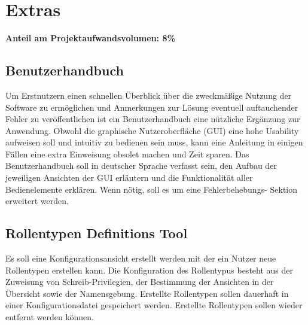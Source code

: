 \section{Extras}
    \textbf{Anteil am Projektaufwandsvolumen: 8\%}
    
    \subsection{Benutzerhandbuch}

    Um Erstnutzern einen schnellen Überblick über die zweckmäßige Nutzung der
    Software zu ermöglichen und Anmerkungen zur Lösung eventuell auftauchender
    Fehler zu veröffentlichen ist ein Benutzerhandbuch eine nützliche Ergänzung
    zur Anwendung. Obwohl die graphische Nutzeroberfläche (GUI) eine hohe
    Usability aufweisen soll und intuitiv zu bedienen sein muss, kann eine
    Anleitung in einigen Fällen eine extra Einweisung obsolet machen und Zeit
    sparen. Das Benutzerhandbuch soll in deutscher Sprache verfasst sein, den
    Aufbau der jeweiligen Ansichten der GUI erläutern und die Funktionalität
    aller Bedienelemente erklären. Wenn nötig, soll es um eine Fehlerbehebungs-
    Sektion erweitert werden.


    \subsection{Rollentypen Definitions Tool}

    Es soll eine Konfigurationsansicht erstellt werden mit der ein Nutzer neue 
    Rollentypen erstellen kann. Die Konfiguration des Rollentypus besteht aus
    der Zuweisung von Schreib-Privilegien, der Bestimmung der Ansichten in der
    Übersicht sowie der Namensgebung. Erstellte Rollentypen sollen dauerhaft in
    einer Konfigurationsdatei gespeichert werden. Erstellte Rollentypen sollen 
    wieder entfernt werden können.